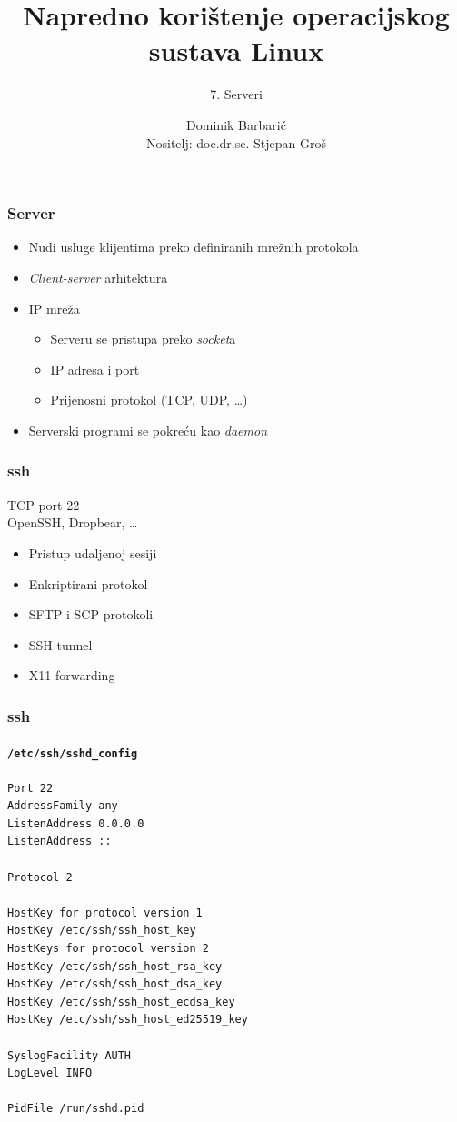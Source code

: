 \documentclass[t,table,usenames,dvipsnames]{beamer}
\date{\todayiso}
\title[NKOSL]{Napredno korištenje operacijskog sustava Linux}
\author[Dominik Barbarić]{Dominik Barbarić\\{\small Nositelj: doc.dr.sc. Stjepan Groš}}
\subtitle{7. Serveri}
\institute[FER]{Sveučilište u Zagrebu\\Fakultet elektrotehnike i računarstva}
\begin{document}
{
	\begin{frame}
		\maketitle
	\end{frame}
}

	
\begin{frame}
	\frametitle{Server}

	\begin{itemize}
		\item Nudi usluge klijentima preko definiranih mrežnih protokola
		\item \emph{Client-server} arhitektura
		
		\item IP mreža
		\begin{itemize}
			\item Serveru se pristupa preko \textit{socket}a
			\item[] IP adresa i port
			\item[] Prijenosni protokol (TCP, UDP, \ldots)
		\end{itemize}
		
		\item Serverski programi se pokreću kao \emph{daemon}

	\end{itemize}

\end{frame}




\begin{frame}
	\frametitle{ssh}
	
	TCP port 22\\
	OpenSSH, Dropbear, \ldots

	\begin{itemize}
		\item Pristup udaljenoj sesiji
		\item Enkriptirani protokol
		
		\item SFTP i SCP protokoli
		\item SSH tunnel
		\item[] X11 forwarding
	\end{itemize}
\end{frame}

\begin{frame}[fragile]
	\frametitle{ssh}
	\framesubtitle{\texttt{/etc/ssh/sshd\_config}}
	\scriptsize
	\begin{verbatim}
Port 22
AddressFamily any
ListenAddress 0.0.0.0
ListenAddress ::

Protocol 2

HostKey for protocol version 1
HostKey /etc/ssh/ssh_host_key
HostKeys for protocol version 2
HostKey /etc/ssh/ssh_host_rsa_key
HostKey /etc/ssh/ssh_host_dsa_key
HostKey /etc/ssh/ssh_host_ecdsa_key
HostKey /etc/ssh/ssh_host_ed25519_key

SyslogFacility AUTH
LogLevel INFO

PidFile /run/sshd.pid
	\end{verbatim}


\end{frame}
\end{document}
